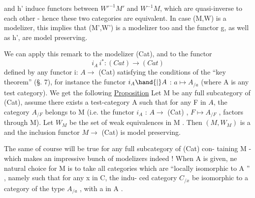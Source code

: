 and h' induce functors between $W'^{-1}M'$ and $W^{-1}M$, which are quasi-inverse
to each other - hence these two categories are equivalent. In case
(M,W) is a modelizer, this implies that (M',W') is a modelizer too and the
 functor g, as well as h', are model preserving.

We can apply this remark to the modelizer (Cat), and to the functor
\[ i_A\, i^{*} : (Cat) \longrightarrow (Cat) \]
defined by any functor i: $A\longrightarrow$ (Cat) satisfying the conditions of the
``key theorem'' (\S. 7), for instance the functor $i_A\hand{|}A$ : $a\longmapsto A_{/a}$
(where A is any test category). We get the following
\uline{Proposition} Let M be any full subcategory of (Cat), assume there exists
a test-category A such that for any F in $A\hat{}$, the category $A_{/F}$ belongs to
M (i.e. the functor $i_A$ : $A\hat{}\longrightarrow$ (Cat) , $F\longmapsto A_{/F}$ , factors through M). 
Let $W_M$ be the set of weak equivalences in M . Then $(M,W_M)$ is a %
  and the inclusion functor $M\to$ (Cat) is model preserving.

The same of course will be true for any full subcategory of (Cat) con-
taining M - which makes an impressive bunch of modelizers indeed ! When
 A is given, ne natural choice for M is to take all categories  which are
``locally isomorphic to A '' , namely such that for any x in C, the indu-
ced category $C_{/x}$ be isomorphic to a category of the type $A_{/a}$ , with a in
A .

